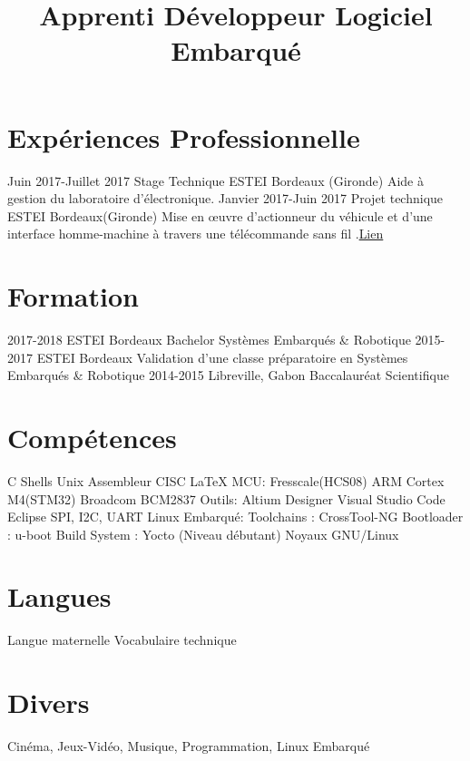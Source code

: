 \documentclass[10pts,a4paper,sans]{moderncv}
\title{Apprenti D\'{e}veloppeur Logiciel Embarqu\'{e}}
\begin{document}
\maketitle

\section{Exp\'{e}riences Professionnelle}
\cventry{} {Juin 2017-Juillet 2017} {Stage Technique} {ESTEI} {Bordeaux (Gironde)} {Aide à gestion du laboratoire d’électronique.} {}
\cventry{} {Janvier 2017-Juin 2017} {Projet technique} {ESTEI} {Bordeaux(Gironde)} {Mise en œuvre d'actionneur du véhicule et d'une interface homme-machine à travers une télécommande sans fil .\href{https://github.com/jorisoffouga/projet_vehicule_interactif_B2}{Lien}}
{} {}

\section{Formation}
\cventry{} {2017-2018} {ESTEI} {Bordeaux} {Bachelor Systèmes Embarqués \& Robotique} {}
\cventry{} {2015-2017} {ESTEI} {Bordeaux} {Validation d'une classe préparatoire en Systèmes Embarqués \& Robotique} {}
\cventry{} {2014-2015} {Libreville, Gabon} {Baccalauréat Scientifique} {} {}

\section{Compétences}
 {C \newline {} Shells Unix \newline {} Assembleur CISC \newline {} \LaTeX} {MCU:} {Fresscale(HCS08) \newline {} ARM Cortex M4(STM32)}
 {Broadcom BCM2837} {Outils:} {Altium Designer \newline {} Visual Studio Code \newline {} Eclipse}
 {SPI, I2C, UART} {Linux Embarqu\'{e}:}{ 
	Toolchains : CrossTool-NG
	\newline {} Bootloader : u-boot
	\newline {} Build System : Yocto (Niveau débutant)
	\newline {} Noyaux GNU/Linux
}

\section{Langues}
 {Langue maternelle}
 {Vocabulaire technique} 
\newpage
\section{Divers}
 {Cinéma, Jeux-Vidéo, Musique, Programmation, Linux Embarqué}
\end{document}
